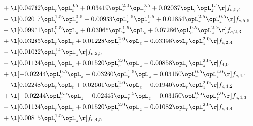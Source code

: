 \begin{alignat}{2}
& + \l[  0.04762 \opL_r \opL_z^{0.5} +  0.03419 \opL_r^{2.0} \opL_z^{0.5} +  0.02037 \opL_r \opL_z^{1.5}  \r] f_{c,5,4} \nonumber \\ 
& - \l[  0.02017 \opL_r^{1.5} \opL_z^{0.5} +  0.00933 \opL_r^{1.5} \opL_z^{1.5} +  0.01854 \opL_r^{2.5} \opL_z^{0.5}  \r] f_{c,5,5} \nonumber \\ 
& - \l[  0.09971 \opL_r^{0.5} \opL_z +  0.03065 \opL_r^{1.5} \opL_z +  0.07286 \opL_r^{0.5} \opL_z^{2.0}  \r] f_{c,2,3} \nonumber \\ 
& + \l[  0.03285 \opL_r \opL_z +  0.01228 \opL_r^{2.0} \opL_z +  0.03398 \opL_r \opL_z^{2.0}  \r] f_{c,2,4} \nonumber \\ 
& - \l[  0.01022 \opL_r^{1.5} \opL_z  \r] f_{c,2,5} \nonumber \\ 
& - \l[  0.01124 \opL_r \opL_z +  0.01520 \opL_r^{2.0} \opL_z +  0.00858 \opL_r \opL_z^{2.0}  \r] f_{4,0} \nonumber \\ 
& + \l[  -0.02244 \opL_r^{0.5} \opL_z +  0.03260 \opL_r^{1.5} \opL_z   -0.03150 \opL_r^{0.5} \opL_z^{2.0}  \r] f_{c,4,1} \nonumber \\ 
& - \l[  0.02248 \opL_r \opL_z +  0.02661 \opL_r^{2.0} \opL_z +  0.01940 \opL_r \opL_z^{2.0}  \r] f_{c,4,2} \nonumber \\ 
& + \l[  -0.02244 \opL_r^{0.5} \opL_z +  0.02445 \opL_r^{1.5} \opL_z   -0.03150 \opL_r^{0.5} \opL_z^{2.0}  \r] f_{c,4,3} \nonumber \\ 
& - \l[  0.01124 \opL_r \opL_z +  0.01520 \opL_r^{2.0} \opL_z +  0.01082 \opL_r \opL_z^{2.0}  \r] f_{c,4,4} \nonumber \\ 
& + \l[  0.00815 \opL_r^{1.5} \opL_z  \r] f_{c,4,5} \nonumber \\ 
\end{alignat} 


